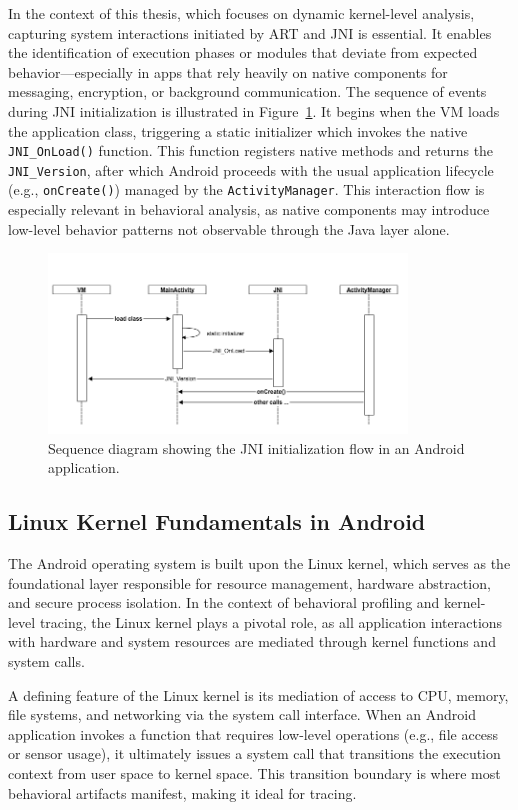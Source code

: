 \documentclass[a4paper,12pt]{report}
\begin{document}
In the context of this thesis, which focuses on dynamic kernel-level analysis, capturing system interactions initiated by ART and JNI is essential. It enables the identification of execution phases or modules that deviate from expected behavior—especially in apps that rely heavily on native components for messaging, encryption, or background communication.
The sequence of events during JNI initialization is illustrated in Figure~\ref{fig:jni_init}.
It begins when the VM loads the application class, triggering a static initializer which invokes
the native \texttt{JNI\_OnLoad()} function. This function registers native methods and returns
the \texttt{JNI\_Version}, after which Android proceeds with the usual application lifecycle
(e.g., \texttt{onCreate()}) managed by the \texttt{ActivityManager}.
This interaction flow is especially relevant in behavioral analysis,
as native components may introduce low-level behavior patterns not observable through the Java layer alone.


\begin{figure}[H]
    \centering
    \includegraphics[width=0.85\textwidth]{jni_init_flow.png}
    \caption{Sequence diagram showing the JNI initialization flow in an Android application.}
    \label{fig:jni_init}
\end{figure}
\subsection{Linux Kernel Fundamentals in Android}
The Android operating system is built upon the Linux kernel, which serves as the foundational layer responsible for resource management, hardware abstraction, and secure process isolation. In the context of behavioral profiling and kernel-level tracing, the Linux kernel plays a pivotal role, as all application interactions with hardware and system resources are mediated through kernel functions and system calls.

A defining feature of the Linux kernel is its mediation of access to CPU, memory, file systems, and networking via the system call interface. When an Android application invokes a function that requires low-level operations (e.g., file access or sensor usage), it ultimately issues a system call that transitions the execution context from user space to kernel space. This transition boundary is where most behavioral artifacts manifest, making it ideal for tracing.
\end{document}
